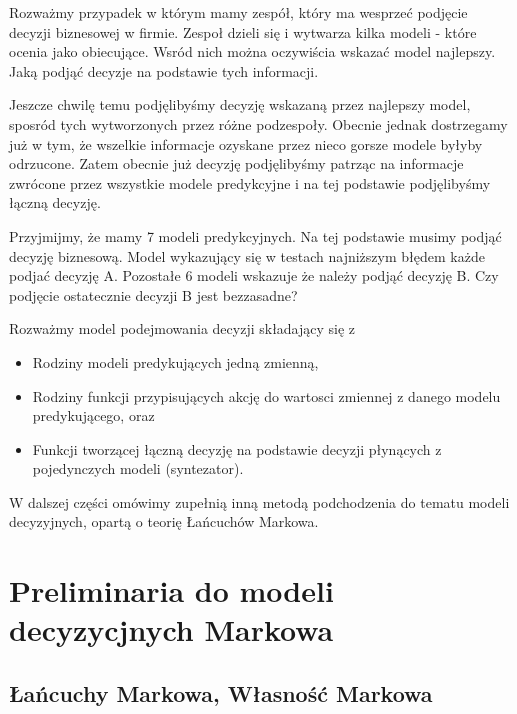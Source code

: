 \documentclass[10pt,a4paper]{book}
\begin{document}
\begin{problem*}
Rozważmy przypadek w którym mamy zespół, który ma wesprzeć podjęcie decyzji biznesowej w firmie. Zespoł dzieli się i wytwarza kilka modeli - które ocenia jako obiecujące. Wsród nich można oczywiścia wskazać model najlepszy. Jaką podjąć decyzje na podstawie tych informacji.
\end{problem*}

Jeszcze chwilę temu podjęlibyśmy decyzję wskazaną przez najlepszy model, sposród tych wytworzonych przez różne podzespoły. Obecnie jednak dostrzegamy już w tym, że wszelkie informacje ozyskane przez nieco gorsze modele byłyby odrzucone. Zatem obecnie już decyzję podjęlibyśmy patrząc na informacje zwrócone przez wszystkie modele predykcyjne i na tej podstawie podjęlibyśmy łączną decyzję.

\begin{problem*}
Przyjmijmy, że mamy 7 modeli predykcyjnych. Na tej podstawie musimy podjąć decyzję biznesową. Model wykazujący się w testach najniższym błędem każde podjać decyzję A. Pozostałe 6 modeli wskazuje że należy podjąć decyzję B. Czy podjęcie ostatecznie decyzji B jest bezzasadne?
\end{problem*}

\begin{definition}
Rozważmy model podejmowania decyzji składający się z 
\begin{itemize}
\item Rodziny modeli predykujących jedną zmienną,
\item Rodziny funkcji przypisujących akcję do wartosci zmiennej z danego modelu predykującego, oraz
\item Funkcji tworzącej łączną decyzję na podstawie decyzji płynących z pojedynczych modeli (syntezator).
\end{itemize}
\end{definition}

W dalszej części omówimy zupełnią inną metodą podchodzenia do tematu modeli decyzyjnych, opartą o teorię Łańcuchów Markowa.

\section{Preliminaria do modeli decyzycjnych Markowa}

\subsection{Łańcuchy Markowa, Własność Markowa}
\end{document}
